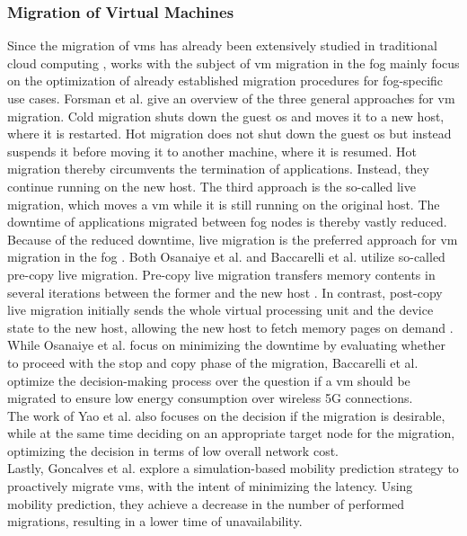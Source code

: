 \subsubsection{Migration of Virtual Machines}
\label{lMigrationVM}
Since the migration of \gls{vm}s has already been extensively studied in traditional cloud computing \cite{Yao.2015}, works with the subject of \gls{vm} migration in the fog mainly focus on the optimization of already established migration procedures for fog-specific use cases. Forsman et al. \cite{Forsman.2015} give an overview of the three general approaches for \gls{vm} migration. Cold migration shuts down the guest \gls{os} and moves it to a new host, where it is restarted. Hot migration does not shut down the guest \gls{os} but instead suspends it before moving it to another machine, where it is resumed. Hot migration thereby circumvents the termination of applications. Instead, they continue running on the new host. The third approach is the so-called live migration, which moves a \gls{vm} while it is still running on the original host. The downtime of applications migrated between fog nodes is thereby vastly reduced. Because of the reduced downtime, live migration is the preferred approach for \gls{vm} migration in the fog \cite{Baccarelli.2018, Osanaiye.2017}. Both Osanaiye et al. \cite{Osanaiye.2017} and Baccarelli et al. \cite{Baccarelli.2018} utilize so-called pre-copy live migration. Pre-copy live migration transfers memory contents in several iterations between the former and the new host \cite{Osanaiye.2017}. In contrast, post-copy live migration initially sends the whole virtual processing unit and the device state to the new host, allowing the new host to fetch memory pages on demand \cite{Osanaiye.2017}. While Osanaiye et al. \cite{Osanaiye.2017} focus on minimizing the downtime by evaluating whether to proceed with the stop and copy phase of the migration, Baccarelli et al. \cite{Baccarelli.2018} optimize the decision-making process over the question if a \gls{vm} should be migrated to ensure low energy consumption over wireless 5G connections.\\
The work of Yao et al. \cite{Yao.2015} also focuses on the decision if the migration is desirable, while at the same time deciding on an appropriate target node for the migration, optimizing the decision in terms of low overall network cost.\\
Lastly, Goncalves et al. \cite{Goncalves.2018} explore a simulation-based mobility prediction strategy to proactively migrate \gls{vm}s, with the intent of minimizing the latency. Using mobility prediction, they achieve a decrease in the number of performed migrations, resulting in a lower time of unavailability.


